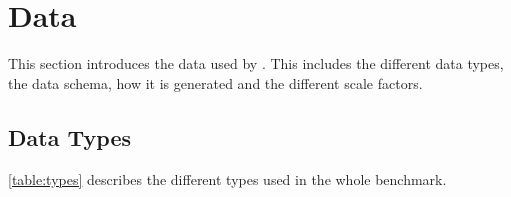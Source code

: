 
\section{Data}
\label{section:data}

This section introduces the data used by \ldbcsnb. This includes the different
data types, the data schema, how it is generated and the different scale
factors.

\subsection{Data Types}
\autoref{table:types} describes the different types used in the whole benchmark.

